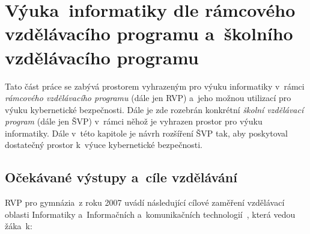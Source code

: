 \documentclass[a4paper, 12pt]{article}
\begin{document}
\newpage
\section{Výuka~informatiky dle rámcového vzdělávacího programu a~školního vzdělávacího programu}
Tato část práce se zabývá prostorem vyhrazeným pro výuku informatiky v~rámci \textit{rámcového vzdělávacího programu} (dále jen RVP) a~jeho možnou utilizací pro výuku kybernetické bezpečnosti. Dále je zde rozebrán konkrétní \textit{školní vzdělávací program} (dále jen ŠVP) v~rámci něhož je vyhrazen prostor pro výuku informatiky. Dále v~této kapitole je návrh rozšíření ŠVP tak, aby poskytoval dostatečný prostor k~výuce kybernetické bezpečnosti. 

\subsection{Očekávané výstupy a~cíle vzdělávání}
RVP pro gymnázia~z roku 2007 uvádí následující cílové zaměření vzdělávací oblasti Informatiky a~Informačních a~komunikačních technologií~\cite{rvpGym}, která vedou žáka~k:
\end{document}

